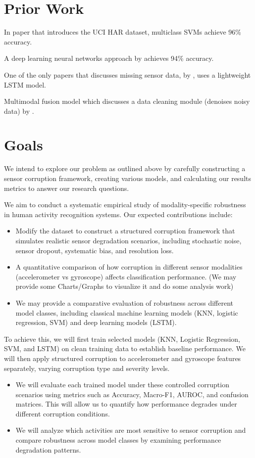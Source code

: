 \documentclass{article}
\begin{document}
\section{Prior Work}
In paper that introduces the UCI HAR dataset, multiclass SVMs achieve 96\% accuracy.

A deep learning neural networks approach by \cite{ronao-2016} achieves 94\% accuracy.

One of the only papers that discusses missing sensor data, by \cite{saha-2025}, uses a lightweight LSTM model.

Multimodal fusion model which discusses a data cleaning module (denoises noisy data) by \cite{xaviar-2023}.

\section{Goals}
We intend to explore our problem as outlined above by carefully constructing a sensor corruption framework, creating various models, and calculating our results metrics to answer our research questions.

We aim to conduct a systematic empirical study of modality-specific robustness in human activity recognition systems.
Our expected contributions include:
\begin{itemize}
    \item Modify the dataset to construct a structured corruption framework that simulates realistic sensor degradation scenarios, including stochastic noise, sensor dropout, systematic bias, and resolution loss.
    \item A quantitative comparison of how corruption in different sensor modalities (accelerometer vs gyroscope) affects classification performance. (We may provide some Charts/Graphs to visualize it and do some analysis work)
    \item We may provide a comparative evaluation of robustness across different model classes, including classical machine learning models (KNN, logistic regression, SVM) and deep learning models (LSTM).
\end{itemize}

To achieve this, we will first train selected models (KNN, Logistic Regression, SVM, and LSTM) on clean training data to establish baseline performance. We will then apply structured corruption to accelerometer and gyroscope features separately, varying corruption type and severity levels.
\begin{itemize}
    \item We will evaluate each trained model under these controlled corruption scenarios using metrics such as Accuracy, Macro-F1, AUROC, and confusion matrices. This will allow us to quantify how performance degrades under different corruption conditions.
    \item We will analyze which activities are most sensitive to sensor corruption and compare robustness across model classes by examining performance degradation patterns.
\end{itemize}



\end{document}
